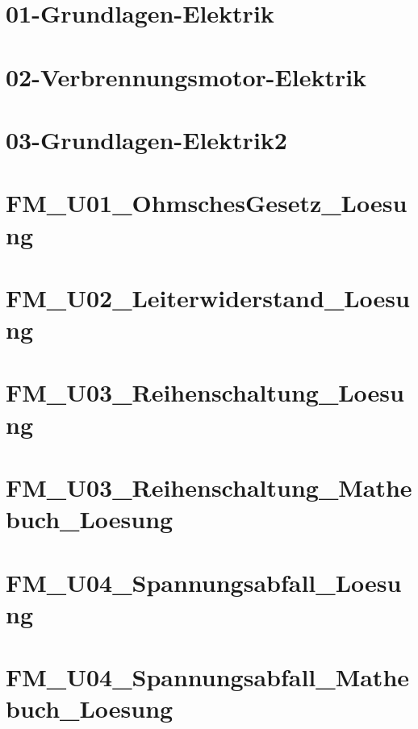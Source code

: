 



\chapter{01-Grundlagen-Elektrik}
%
\chapter{02-Verbrennungsmotor-Elektrik}
%
\chapter{03-Grundlagen-Elektrik2}
%
\chapter{FM_U01_OhmschesGesetz_Loesung}
%
\chapter{FM_U02_Leiterwiderstand_Loesung}
%
\chapter{FM_U03_Reihenschaltung_Loesung}
%
\chapter{FM_U03_Reihenschaltung_Mathebuch_Loesung}
%
\chapter{FM_U04_Spannungsabfall_Loesung}
%
\chapter{FM_U04_Spannungsabfall_Mathebuch_Loesung}
%
